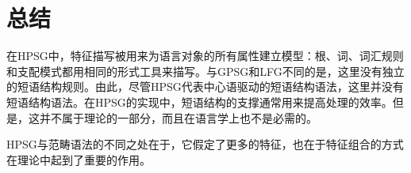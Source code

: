 

\section{总结}

在HPSG中，特征描写被用来为语言对象的所有属性建立模型：根、词、词汇规则和支配模式都用相同的形式工具来描写。与GPSG\indexgpsgc 和LFG\indexlfgc 不同的是，这里没有独立的短语结构规则。由此，尽管HPSG代表中心语驱动的短语结构语法，这里并没有短语结构语法。在HPSG的实现中，短语结构的支撑通常用来提高处理的效率。但是，这并不属于理论的一部分，而且在语言学上也不是必需的。

HPSG与范畴语法的不同之处在于\indexcgc，它假定了更多的特征，也在于特征组合的方式在理论中起到了重要的作用。

